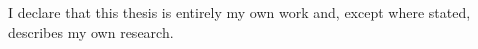 I declare that this thesis is entirely my own work and, except where stated, describes my own research.
